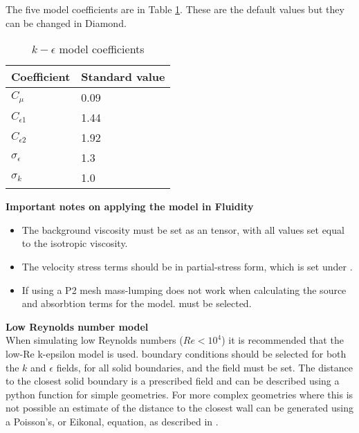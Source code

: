 

The five model coefficients are in Table \ref{tab:kepsco}. These are the default values but they can be changed in Diamond.

\begin{table}[hb]
\begin{center}
\begin{tabular}{ll}\hline
Coefficient & Standard value \\ \hline
$C_\mu$ & 0.09 \\
$C_{\epsilon1}$ & 1.44 \\
$C_{\epsilon2}$ & 1.92 \\
$\sigma_\epsilon$ & 1.3 \\
$\sigma_k$ & 1.0 \\ \hline
\end{tabular}
\end{center}
\caption{$k-\epsilon$ model coefficients}
\label{tab:kepsco}
\end{table}

\par{\textbf{Important notes on applying the model in Fluidity}}
\begin{itemize}
\item The background viscosity must be set as an  tensor, with all values set equal to the isotropic viscosity.
\item The velocity stress terms should be in partial-stress form, which is set under .
\item If using a P2 mesh mass-lumping does not work when calculating the source and absorbtion terms for the model.  must be selected.
\end{itemize}

\par{\textbf{Low Reynolds number model}\\}
When simulating low Reynolds numbers ($Re<10^4$) it is recommended that the low-Re k-epsilon model is used.  boundary conditions should be selected for both the $k$ and $\epsilon$ fields, for all solid boundaries, and the  field must be set. The distance to the closest solid boundary is a prescribed field and can be described using a python function for simple geometries. For more complex geometries where this is not possible an estimate of the distance to the closest wall can be generated using a Poisson's, or Eikonal, equation, as described in \citet{Tucker2011}. 

